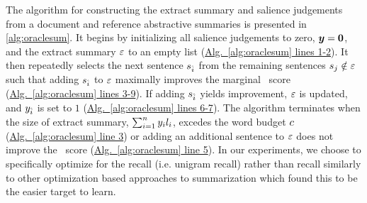 The algorithm for constructing the extract summary and salience judgements from
a document and reference abstractive summaries is presented in
\autoref{alg:oraclesum}. It begins by initializing all salience judgements to
zero, $\boldsymbol{y} = \mathbf{0}$, and the extract summary $\varepsilon$ to an
empty list (\hyperref[alg:oraclesum]{Alg.~\ref{alg:oraclesum} lines 1-2}). It
then repeatedly selects the next sentence $s_{\hat{i}}$ from the remaining
sentences $s_j \notin \varepsilon$ such that adding $s_{\hat{i}}$
to $\varepsilon$ maximally improves the marginal \rouge~score
(\hyperref[alg:oraclesum]{Alg.~\ref{alg:oraclesum} lines 3-9}).  If adding
$s_{\hat{i}}$ yields improvement, $\varepsilon$ is updated, and
$y_{\hat{i}}$ is set to $1$
(\hyperref[alg:oraclesum]{Alg.~\ref{alg:oraclesum} lines 6-7}). The algorithm
terminates when the size of extract summary, $\sum_{i=1}^n y_i
l_i$, excedes the word budget $c$
(\hyperref[alg:oraclesum]{Alg.~\ref{alg:oraclesum} line  3}) or adding an
additional sentence to $\varepsilon$ does not improve the \rouge~score
(\hyperref[alg:oraclesum]{Alg.~\ref{alg:oraclesum} line 5}).  In our
experiments, we choose to specifically optimize for the  recall (i.e.
unigram recall) rather than  recall similarly to other optimization
based approaches to summarization \citep{sipos2012large,durrett2016learning}
which found this to be the easier target to learn.
